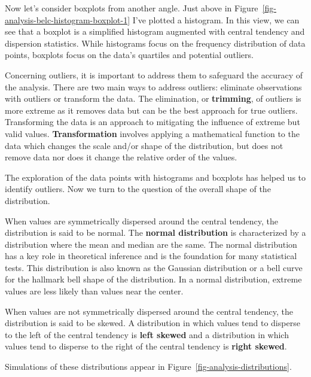 \documentclass[
  letterpaper,
  krantz1]{latex/krantz-mod}
\theoremstyle{definition}
\theoremstyle{definition}
\theoremstyle{remark}
\begin{document}
Now let's consider boxplots from another angle. Just above in
Figure~\ref{fig-analysis-belc-histogram-boxplot-1} I've plotted a
histogram. In this view, we can see that a boxplot is a simplified
histogram augmented with central tendency and dispersion statistics.
While histograms focus on the frequency distribution of data points,
boxplots focus on the data's quartiles and potential outliers.

Concerning outliers, it is important to address them to
safeguard the accuracy of the analysis. There are two main ways to
address outliers: eliminate observations with outliers or transform the
data. The elimination, or \textbf{trimming},
of outliers is more extreme as it removes data but can be the best
approach for true outliers. Transforming the data is an approach to
mitigating the influence of extreme but valid values.
\textbf{Transformation} involves
applying a mathematical function to the data which changes the scale
and/or shape of the distribution, but does not remove data nor does it
change the relative order of the values.

The exploration of the data points with histograms and boxplots has
helped us to identify outliers. Now we turn to the question of the
overall shape of the distribution.

When values are symmetrically dispersed around the central tendency, the
distribution is said to be normal. The \textbf{normal
distribution} is characterized by a
distribution where the mean and median are the same. The normal
distribution has a key role in theoretical
inference and is the foundation for many
statistical tests. This distribution is also known as the Gaussian
distribution or a bell curve for the hallmark bell shape of the
distribution. In a normal distribution, extreme values are less likely
than values near the center.

When values are not symmetrically dispersed around the central
tendency, the distribution is said to be
skewed. A distribution in which values tend
to disperse to the left of the central tendency is \textbf{left skewed}
and a distribution in which values tend to disperse to the right of the
central tendency is \textbf{right skewed}.

Simulations of these distributions appear in
Figure~\ref{fig-analysis-distributions}.
\end{document}

